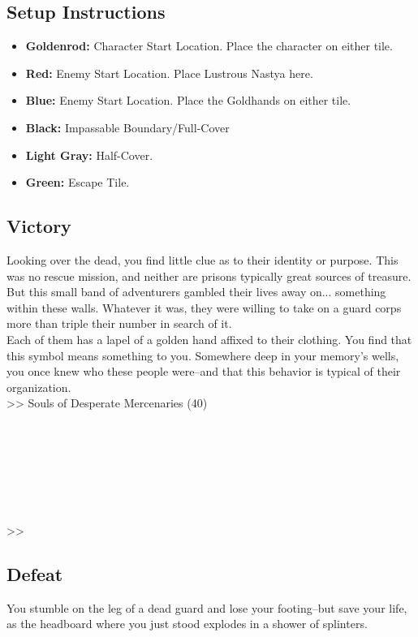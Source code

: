 \subsection*{Setup Instructions}
\begin{itemize}
\item \textbf{Goldenrod:} Character Start Location. Place the character on either tile.
\item \textbf{Red:} Enemy Start Location. Place Lustrous Nastya here.
\item \textbf{Blue:} Enemy Start Location. Place the Goldhands on either tile.
\item \textbf{Black:} Impassable Boundary/Full-Cover
\item \textbf{Light Gray:} Half-Cover.
\item \textbf{Green:} Escape Tile.
\end{itemize}

\pagebreak

\subsection*{Victory}
Looking over the dead, you find little clue as to their identity or purpose. This was no rescue mission, and neither are prisons typically great sources of treasure. But this small band of adventurers gambled their lives away on... something within these walls. Whatever it was, they were willing to take on a guard corps more than triple their number in search of it.\\

Each of them has a lapel of a golden hand affixed to their clothing. You find that this symbol means something to you. Somewhere deep in your memory’s wells, you once knew who these people were--and that this behavior is typical of their organization.\\

>> Souls of Desperate Mercenaries (40)\\
\\
\\
\\
\\
\\
\\
\\
>> 

\subsection*{Defeat}
You stumble on the leg of a dead guard and lose your footing--but save your life, as the headboard where you just stood explodes in a shower of splinters.\\

